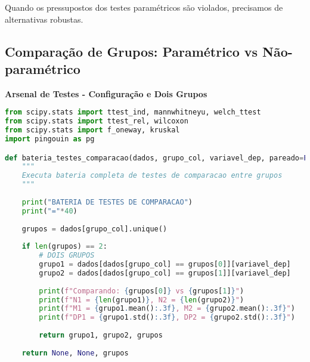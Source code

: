 Quando os pressupostos dos testes paramétricos são violados, precisamos de alternativas robustas.

\subsection{Comparação de Grupos: Paramétrico vs Não-paramétrico}

\begin{examplebox}
\textbf{Arsenal de Testes - Configuração e Dois Grupos}

\begin{lstlisting}[language=Python]
from scipy.stats import ttest_ind, mannwhitneyu, welch_ttest
from scipy.stats import ttest_rel, wilcoxon
from scipy.stats import f_oneway, kruskal
import pingouin as pg

def bateria_testes_comparacao(dados, grupo_col, variavel_dep, pareado=False):
    """
    Executa bateria completa de testes de comparacao entre grupos
    """
    
    print("BATERIA DE TESTES DE COMPARACAO")
    print("="*40)
    
    grupos = dados[grupo_col].unique()
    
    if len(grupos) == 2:
        # DOIS GRUPOS
        grupo1 = dados[dados[grupo_col] == grupos[0]][variavel_dep]
        grupo2 = dados[dados[grupo_col] == grupos[1]][variavel_dep]
        
        print(f"Comparando: {grupos[0]} vs {grupos[1]}")
        print(f"N1 = {len(grupo1)}, N2 = {len(grupo2)}")
        print(f"M1 = {grupo1.mean():.3f}, M2 = {grupo2.mean():.3f}")
        print(f"DP1 = {grupo1.std():.3f}, DP2 = {grupo2.std():.3f}")
        
        return grupo1, grupo2, grupos
    
    return None, None, grupos
\end{lstlisting}
\end{examplebox}

